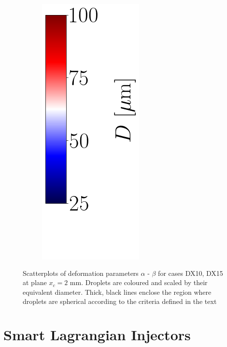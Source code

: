 \begin{figure}[ht]
\begin{subfigure}[b]{0.4\textwidth}
\end{subfigure}
\begin{subfigure}[b]{0.1\textwidth}
	\centering
	\hspace*{0.35in}
   \includegraphics[scale=0.5]{./part3_applications/figures_ch8_resolved/SPRAY_characterization/deformation/scatterplots_colorbar_D_with_blank_space.png}
\end{subfigure}
   \caption[Scatterplots of deformation parameters $\alpha$ - $\beta$ for cases DX10, DX15 at plane $x_c = 2$ mm ]{Scatterplots of deformation parameters $\alpha$ - $\beta$ for cases DX10, DX15 at plane $x_c = 2$ mm. Droplets are coloured and scaled by their equivalent diameter. Thick, black lines enclose the region where droplets are spherical according to the criteria defined in the text}
\label{fig:ch8_jicf_global_scatterplots_deformation}
\end{figure}




\section{Smart Lagrangian Injectors}
\label{sec:ch8_learning_SLI_in_BIMER}





